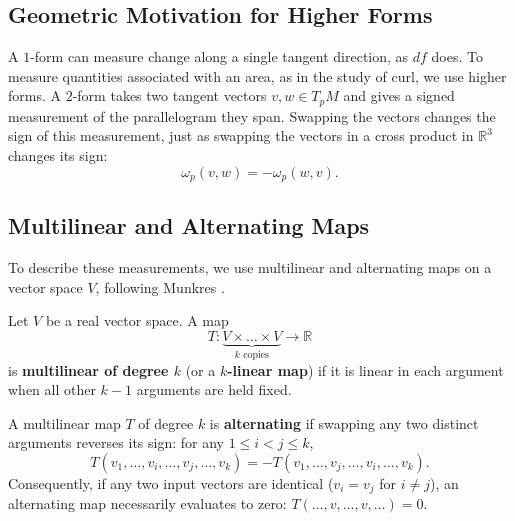     \subsection{Geometric Motivation for Higher Forms}
    A $1$-form can measure change along a single tangent direction, as $df$
    does. To measure quantities associated with an area, as in the study of
    curl, we use higher forms. A $2$-form takes two tangent vectors
    $v,w \in T_pM$ and gives a signed measurement of the parallelogram they span. Swapping the vectors changes the sign of this measurement,
    just as swapping the vectors in a cross product in $\mathbb{R}^3$
    changes its sign:
    \[
        \omega_p(v,w) = -\omega_p(w,v).
    \]

    \subsection{Multilinear and Alternating Maps}
    To describe these measurements, we use multilinear and alternating maps
    on a vector space $V$, following Munkres \cite[\S26, p.~220;
    \S27, pp.~229--230]{munkres1991analysis}.

    \begin{definition}
        Let $V$ be a real vector space. A map
        \[
            T \colon \underbrace{V \times \dots \times V}_{k \text{ copies}}
            \to \mathbb{R}
        \]
        is \textbf{multilinear of degree $k$} (or a \textbf{$k$-linear map}) if
        it is linear in each argument when all other $k-1$ arguments are held
        fixed.

        A multilinear map $T$ of degree $k$ is \textbf{alternating} if swapping
        any two distinct arguments reverses its sign: for any $1 \le i < j \le
        k$,
        \begin{equation}
            T(v_1, \dots, v_i, \dots, v_j, \dots, v_k)
            = -T(v_1, \dots, v_j, \dots, v_i, \dots, v_k).
        \end{equation}
        Consequently, if any two input vectors are identical ($v_i = v_j$ for
        $i \neq j$), an alternating map necessarily evaluates to zero:
        $T(\dots, v, \dots, v, \dots) = 0$.
    \end{definition}

